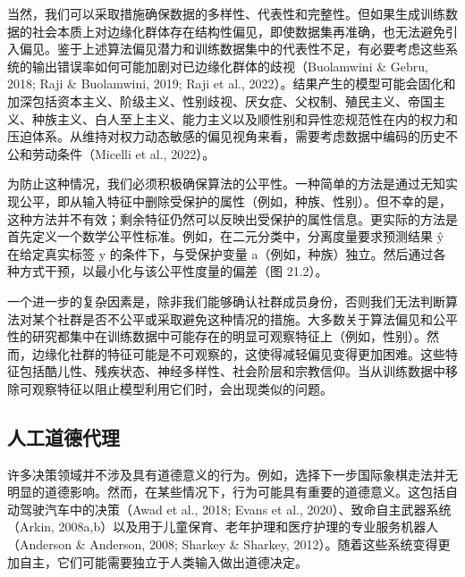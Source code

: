 \documentclass[lang=cn,newtx,10pt,scheme=chinese]{elegantbook}
\begin{document}
当然，我们可以采取措施确保数据的多样性、代表性和完整性。但如果生成训练数据的社会本质上对边缘化群体存在结构性偏见，即使数据集再准确，也无法避免引入偏见。鉴于上述算法偏见潜力和训练数据集中的代表性不足，有必要考虑这些系统的输出错误率如何可能加剧对已边缘化群体的歧视（Buolamwini \& Gebru, 2018; Raji \& Buolamwini, 2019; Raji et al., 2022）。结果产生的模型可能会固化和加深包括资本主义、阶级主义、性别歧视、厌女症、父权制、殖民主义、帝国主义、种族主义、白人至上主义、能力主义以及顺性别和异性恋规范性在内的权力和压迫体系。从维持对权力动态敏感的偏见视角来看，需要考虑数据中编码的历史不公和劳动条件（Micelli et al., 2022）。

为防止这种情况，我们必须积极确保算法的公平性。一种简单的方法是通过无知实现公平，即从输入特征中删除受保护的属性（例如，种族、性别）。但不幸的是，这种方法并不有效；剩余特征仍然可以反映出受保护的属性信息。更实际的方法是首先定义一个数学公平性标准。例如，在二元分类中，分离度量要求预测结果 ŷ 在给定真实标签 y 的条件下，与受保护变量 a（例如，种族）独立。然后通过各种方式干预，以最小化与该公平性度量的偏差（图 21.2）。


一个进一步的复杂因素是，除非我们能够确认社群成员身份，否则我们无法判断算法对某个社群是否不公平或采取避免这种情况的措施。大多数关于算法偏见和公平性的研究都集中在训练数据中可能存在的明显可观察特征上（例如，性别）。然而，边缘化社群的特征可能是不可观察的，这使得减轻偏见变得更加困难。这些特征包括酷儿性、残疾状态、神经多样性、社会阶层和宗教信仰。当从训练数据中移除可观察特征以阻止模型利用它们时，会出现类似的问题。

\subsection{人工道德代理}
许多决策领域并不涉及具有道德意义的行为。例如，选择下一步国际象棋走法并无明显的道德影响。然而，在某些情况下，行为可能具有重要的道德意义。这包括自动驾驶汽车中的决策（Awad et al., 2018; Evans et al., 2020）、致命自主武器系统（Arkin, 2008a,b）以及用于儿童保育、老年护理和医疗护理的专业服务机器人（Anderson \& Anderson, 2008; Sharkey \& Sharkey, 2012）。随着这些系统变得更加自主，它们可能需要独立于人类输入做出道德决定。
\end{document}
